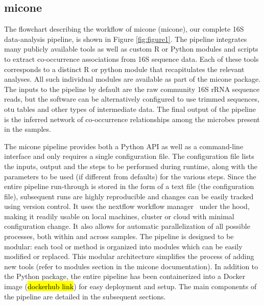   \subsection*{\ac{micone}}

  \vspace{-5mm}
  The flowchart describing the workflow of \ac{micone} (\acl{micone}), our complete 16S data-analysis pipeline, is shown in Figure \ref{fig:figure1}.
  The pipeline integrates many publicly available tools as well as custom R or Python modules and scripts to extract co-occurrence associations from 16S sequence data. Each of these tools corresponds to a distinct R or python module that recapitulates the relevant analyses. All such individual modules are available as part of the \ac{micone} package.
  The inputs to the pipeline by default are the raw community 16S rRNA sequence reads, but the software can be alternatively configured to use trimmed sequences, \ac{otu} tables and other types of intermediate data.
  The final output of the pipeline is the inferred network of co-occurrence relationships among the microbes present in the samples.

  The \ac{micone} pipeline provides both a Python API as well as a command-line interface and only requires a single configuration file.
  The configuration file lists the inputs, output and the steps to be performed during runtime, along with the parameters to be used (if different from defaults) for the various steps.
  Since the entire pipeline run-through is stored in the form of a text file (the configuration file), subsequent runs are highly reproducible and changes can be easily tracked using version control.
  It uses the nextflow workflow manager~\cite{Tommaso2015} under the hood, making it readily usable on local machines, cluster or cloud with minimal configuration change.
  It also allows for automatic parallelization of all possible processes, both within and across samples.
  The pipeline is designed to be modular: each tool or method is organized into modules which can be easily modified or replaced.
  This modular architecture simplifies the process of adding new tools (refer to modules section in the \ac{micone} documentation).
  In addition to the Python package, the entire pipeline has been containerized into a Docker~\cite{Merkel1994} image (\hl{dockerhub link}) for easy deployment and setup.
  The main components of the pipeline are detailed in the subsequent sections.

